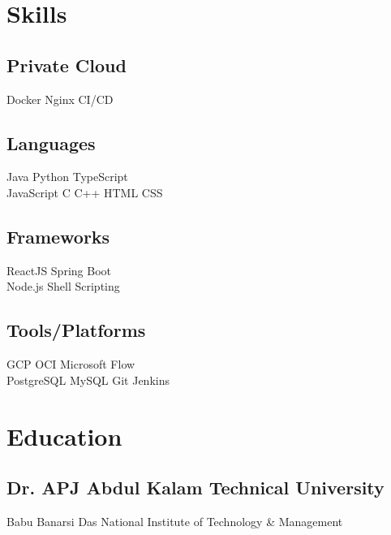 \documentclass[]{dhirendra-pratap-singh-resume}
\begin{document}
\begin{minipage}[t]{0.33\textwidth}


\section{Skills}
{\subsection{Private Cloud}}
\href{https://dozzle.hanisntsolo.com}{}
Docker \textbullet{} Nginx \textbullet{} CI/CD
\subsection{Languages}
Java \textbullet{} Python \textbullet{} TypeScript \\
JavaScript \textbullet{} C \textbullet{} C++ \textbullet{} HTML \textbullet{} CSS

\subsection{Frameworks}
ReactJS \textbullet{} Spring Boot \\
Node.js \textbullet{} Shell Scripting

\subsection{Tools/Platforms}
GCP \textbullet{} OCI \textbullet{} Microsoft Flow \\
PostgreSQL \textbullet{} MySQL \textbullet{} Git \textbullet{} Jenkins
\

\sectionsep


\section{Education}

\subsection{Dr. APJ Abdul Kalam Technical University}
Babu Banarsi Das National Institute of Technology \& Management\\
\sectionsep


\end{minipage}
\end{document}

